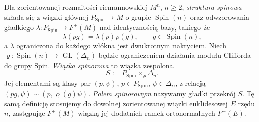 \begin{definicja}
\label{def:struktura-spinowa}
Dla zorientowanej rozmaitości riemannowskiej
$M^n$, $n\geq2$, \emph{struktura spinowa}
składa się z wiązki głównej
$P_{\mathrm{Spin}}\to M$ o grupie
$\operatorname{Spin}(n)$ oraz odwzorowania
gładkiego $\lambda:P_{\mathrm{Spin}}\to F^+(M)$
nad identycznością bazy, takiego że
\[
 \lambda(pg)=\lambda(p)\rho(g),
 \qquad g\in\operatorname{Spin}(n),
\]
a $\lambda$ ograniczona do każdego włókna
jest dwukrotnym nakryciem.
Niech $\varrho:\operatorname{Spin}(n)\to\operatorname{GL}(\Delta_n)$
będzie ograniczeniem działania modułu Clifforda do grupy Spin.
\emph{Wiązka spinorowa} to wiązka zespolona
\[
 S:=P_{\mathrm{Spin}}\times_{\varrho}\Delta_n.
\]
Jej elementami są klasy par $(p,\psi)$,
$p\in P_{\mathrm{Spin}}$, $\psi\in\Delta_n$,
z relacją $(pg,\psi)\sim(p,\varrho(g)\psi)$.
\emph{Polem spinorowym} nazywamy gładki przekrój $S$.
Tę samą definicję stosujemy do dowolnej zorientowanej wiązki
euklidesowej $E$ rzędu $n$, zastępując $F^+(M)$ wiązką jej
dodatnich ramek ortonormalnych $F^+(E)$.
\end{definicja}


